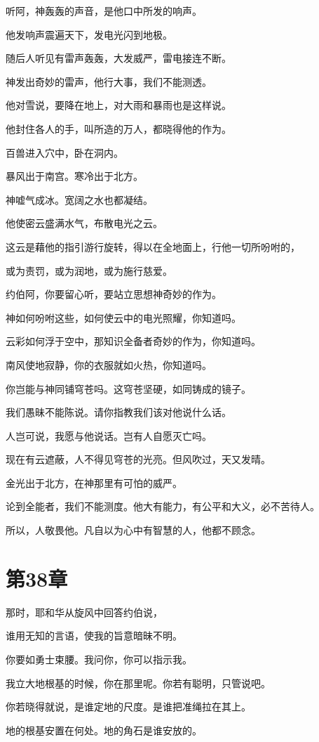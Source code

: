 \documentclass[12pt,oneside]{book}
\begin{document}
听阿，神轰轰的声音，是他口中所发的响声。

他发响声震遍天下，发电光闪到地极。

随后人听见有雷声轰轰，大发威严，雷电接连不断。

神发出奇妙的雷声，他行大事，我们不能测透。

他对雪说，要降在地上，对大雨和暴雨也是这样说。

他封住各人的手，叫所造的万人，都晓得他的作为。

百兽进入穴中，卧在洞内。

暴风出于南宫。寒冷出于北方。

神嘘气成冰。宽阔之水也都凝结。

他使密云盛满水气，布散电光之云。

这云是藉他的指引游行旋转，得以在全地面上，行他一切所吩咐的，

或为责罚，或为润地，或为施行慈爱。

约伯阿，你要留心听，要站立思想神奇妙的作为。

神如何吩咐这些，如何使云中的电光照耀，你知道吗。

云彩如何浮于空中，那知识全备者奇妙的作为，你知道吗。

南风使地寂静，你的衣服就如火热，你知道吗。

你岂能与神同铺穹苍吗。这穹苍坚硬，如同铸成的镜子。

我们愚昧不能陈说。请你指教我们该对他说什么话。

人岂可说，我愿与他说话。岂有人自愿灭亡吗。

现在有云遮蔽，人不得见穹苍的光亮。但风吹过，天又发晴。

金光出于北方，在神那里有可怕的威严。

论到全能者，我们不能测度。他大有能力，有公平和大义，必不苦待人。

所以，人敬畏他。凡自以为心中有智慧的人，他都不顾念。


\chapter{第38章}
那时，耶和华从旋风中回答约伯说，

谁用无知的言语，使我的旨意暗昧不明。

你要如勇士束腰。我问你，你可以指示我。

我立大地根基的时候，你在那里呢。你若有聪明，只管说吧。

你若晓得就说，是谁定地的尺度。是谁把准绳拉在其上。

地的根基安置在何处。地的角石是谁安放的。
\end{document}
